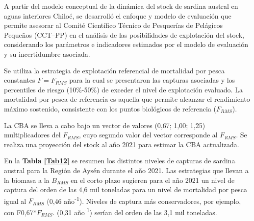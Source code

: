 \documentclass[
  spanish,
]{article}
\begin{document}
A partir del modelo conceptual de la dinámica del stock de sardina
austral en aguas interiores Chiloé, se desarrolló el enfoque y modelo de
evaluación que permite asesorar al Comité Científico Técnico de
Pesquerías de Pelágicos Pequeños (CCT--PP) en el análisis de las
posibilidades de explotación del stock, considerando los parámetros e
indicadores estimados por el modelo de evaluación y su incertidumbre
asociada.

Se utiliza la estrategia de explotación referencial de mortalidad por
pesca constantes \(F=F_{RMS}\) para la cual se presentaron las capturas
asociadas y los percentiles de riesgo (10\%-50\%) de exceder el nivel de
explotación evaluado. La mortalidad por pesca de referencia es aquella
que permite alcanzar el rendimiento máximo sostenido, consistente con
los puntos biológicos de referencia (\(F_{RMS}\)).

La CBA se lleva a cabo bajo un vector de valores (0,67; 1,00; 1,25)
multiplicadores del \(F_{RMS}\), cuyo segundo valor del vector
corresponde al \(F_{RMS}\). Se realiza una proyección del stock al año
2021 para estimar la CBA actualizada.

En la \textbf{Tabla \ref{Tab12}} se resumen los distintos niveles de
capturas de sardina austral para la Región de Aysén durante el año 2021.
Las estrategias que llevan a la biomasa a la \(B_{RMS}\) en el corto
plazo sugieren para el año 2021 un nivel de captura del orden de las 4,6
mil toneladas para un nivel de mortalidad por pesca igual al \(F_{RMS}\)
(0,46 año\textsuperscript{-1}). Niveles de captura más conservadores,
por ejemplo, con F0,67*\(F_{RMS}\). (0,31 año\textsuperscript{-1})
serían del orden de las 3,1 mil toneladas.

\vspace{0.5cm}
\end{document}
